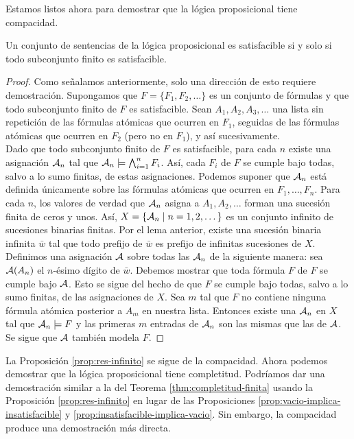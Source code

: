 \message{ !name(main.tex)}\documentclass[12pt,a4paper]{book}
\begin{document}
    Estamos listos ahora para demostrar que la lógica proposicional tiene compacidad.

    \begin{teorema}\label{thm:compacidad}
        Un conjunto de sentencias de la lógica proposicional es satisfacible si y solo si todo subconjunto finito es
        satisfacible.
    \end{teorema}
    \begin{proof}
        Como señalamos anteriormente, solo una dirección de esto requiere demostración. Supongamos que
        $F=\{F_{1},F_{2},\dots\}$ es un conjunto de fórmulas y que todo subconjunto finito de $F$ es satisfacible. Sean
        $A_{1},A_{2},A_{3},\dots$ una lista sin repetición de las fórmulas atómicas que ocurren en $F_{1}$, seguidas de las
        fórmulas atómicas que ocurren en $F_{2}$ (pero no en $F_{1}$), y así sucesivamente.\\
        Dado que todo subconjunto finito de $F$ es satisfacible, para cada $n$ existe una asignación $\AA_{n}$ tal que
        $\AA_{n}\models\bigwedge_{i=1}^{n}F_{i}$. Así, cada $F_{i}$ de $F$ se cumple bajo todas, salvo a lo sumo finitas, de
        estas asignaciones. Podemos suponer que $\AA_{n}$ está definida únicamente sobre las fórmulas atómicas que ocurren
        en $F_{1},\dots,F_{n}$. Para cada $n$, los valores de verdad que $\AA_{n}$ asigna a $A_{1},A_{2},\dots$ forman una
        sucesión finita de ceros y unos. Así, $X=\{\AA_{n}\mid n=1,2,\dots\}$ es un conjunto infinito de sucesiones binarias
        finitas. Por el lema anterior, existe una sucesión binaria infinita $\bar{w}$ tal que todo prefijo de $\bar{w}$ es
        prefijo de infinitas sucesiones de $X$.\\
        Definimos una asignación $\AA$ sobre todas las $\AA_{n}$ de la siguiente manera: sea $\AA(A_{n})$ el $n$-ésimo
        dígito de $\bar{w}$. Debemos mostrar que toda fórmula $F$ de $F$ se cumple bajo $\AA$. Esto se sigue del hecho de
        que $F$ se cumple bajo todas, salvo a lo sumo finitas, de las asignaciones de $X$. Sea $m$ tal que $F$ no contiene
        ninguna fórmula atómica posterior a $A_{m}$ en nuestra lista. Entonces existe una $\AA_{n}$ en $X$ tal que
        $\AA_{n}\models F$ y las primeras $m$ entradas de $\AA_{n}$ son las mismas que las de $\AA$. Se sigue que $\AA$
        también modela $F$.
    \end{proof}

    La Proposición \ref{prop:res-infinito} se sigue de la compacidad. Ahora podemos demostrar que la lógica proposicional
    tiene completitud. Podríamos dar una demostración similar a la del Teorema \ref{thm:completitud-finita} usando la
    Proposición \ref{prop:res-infinito} en lugar de las Proposiciones \ref{prop:vacio-implica-insatisfacible} y
    \ref{prop:insatisfacible-implica-vacio}. Sin embargo, la compacidad produce una demostración más directa.
\end{document}
